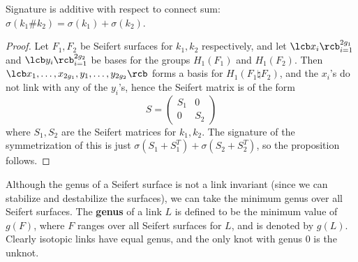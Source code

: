 \begin{prop}
Signature is additive with respect to connect sum: $\sigma(k_1 \# k_2) = \sigma(k_1) + \sigma(k_2)$.
\end{prop}
\begin{proof}
Let $F_1,F_2$ be Seifert surfaces for $k_1,k_2$ respectively, and let $\lcb x_i \rcb_{i=1}^{2g_1}$ and $\lcb y_i \rcb_{i=1}^{2g_2}$ be bases for the groups $H_1(F_1)$ and $H_1(F_2)$. Then $\lcb x_1,\ldots,x_{2g_1},y_1,\ldots,y_{2g_2} \rcb$ forms a basis for $H_1(F_1 \natural F_2)$, and the $x_i$'s do not link with any of the $y_i$'s, hence the Seifert matrix is of the form
\[ S = \begin{pmatrix} S_1 & 0 \\ 0 & S_2 \end{pmatrix} \]
where $S_1,S_2$ are the Seifert matrices for $k_1,k_2$. The signature of the symmetrization of this is just $\sigma(S_1+S_1^T)+\sigma(S_2+S_2^T)$, so the proposition follows.
\end{proof}

Although the genus of a Seifert surface is not a link invariant (since we can stabilize and destabilize the surfaces), we can take the minimum genus over all Seifert surfaces. The \textbf{genus} of a link $L$ is defined to be the minimum value of $g(F)$, where $F$ ranges over all Seifert surfaces for $L$, and is denoted by $g(L)$. Clearly isotopic links have equal genus, and the only knot with genus 0 is the unknot. 

